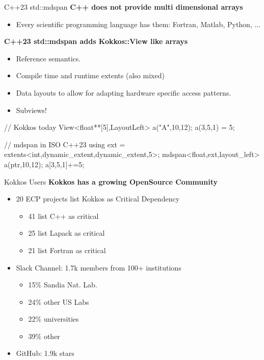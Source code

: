 \iffull
\begin{frame}[fragile]{C++23 std::mdspan}
   \textbf{C++ does not provide multi dimensional arrays}
	\begin{itemize}
           \item Every scientific programming language has them: Fortran, Matlab, Python, ... 
	\end{itemize}

	\textbf{C++23 std::mdspan adds Kokkos::View like arrays}
	\begin{itemize}
		\item Reference semantics.
		\item Compile time and runtime extents (also mixed)
		\item Data layouts to allow for adapting hardware specific access patterns. 
		\item Subviews!
	\end{itemize}

  \begin{code}[linebackgroundcolor={
      },
      keywords={View,LayoutLeft,extents,mdspan,dynamic_extent,layout_left}, frame=single
    ]
// Kokkos today
View<float**[5],LayoutLeft> a("A",10,12); a(3,5,1) = 5;

// mdspan in ISO C++23
using ext = extents<int,dynamic_extent,dynamic_extent,5>;
mdspan<float,ext,layout_left> a(ptr,10,12); a[3,5,1]+=5;
  \end{code}

\end{frame}
\fi

\iffull
\begin{frame}{Kokkos Users}
\textbf{Kokkos has a growing OpenSource Community}

\vspace{0.5cm}
\begin{itemize}
  \item 20 ECP projects list Kokkos as Critical Dependency
    \begin{itemize}
       \item 41 list C++ as critical
       \item 25 list Lapack as critical
       \item 21 list Fortran as critical
    \end{itemize}
  \item Slack Channel: 1.7k members from 100+ institutions
    \begin{itemize}
      \item 15\% Sandia Nat. Lab.
      \item 24\% other US Labs
      \item 22\% universities
      \item 39\% other
    \end{itemize}
  \item GitHub: 1.9k stars
\end{itemize}



\end{frame}
\fi
